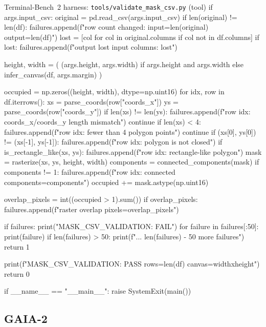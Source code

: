 \begin{promptbox}{Terminal-Bench~2 harness: \texttt{tools/validate\_mask\_csv.py} (tool)}
    if args.input_csv:
        original = pd.read_csv(args.input_csv)
        if len(original) != len(df):
            failures.append(f"row count changed: input={len(original)} output={len(df)}")
        lost = [col for col in original.columns if col not in df.columns]
        if lost:
            failures.append(f"output lost input columns: {lost}")

    height, width = (
        (args.height, args.width)
        if args.height and args.width
        else infer_canvas(df, args.margin)
    )

    occupied = np.zeros((height, width), dtype=np.uint16)
    for idx, row in df.iterrows():
        xs = parse_coords(row["coords_x"])
        ys = parse_coords(row["coords_y"])
        if len(xs) != len(ys):
            failures.append(f"row {idx}: coords_x/coords_y length mismatch")
            continue
        if len(xs) < 4:
            failures.append(f"row {idx}: fewer than 4 polygon points")
            continue
        if (xs[0], ys[0]) != (xs[-1], ys[-1]):
            failures.append(f"row {idx}: polygon is not closed")
        if is_rectangle_like(xs, ys):
            failures.append(f"row {idx}: rectangle-like polygon")
        mask = rasterize(xs, ys, height, width)
        components = connected_components(mask)
        if components != 1:
            failures.append(f"row {idx}: connected components={components}")
        occupied += mask.astype(np.uint16)

    overlap_pixels = int((occupied > 1).sum())
    if overlap_pixels:
        failures.append(f"raster overlap pixels={overlap_pixels}")

    if failures:
        print("MASK_CSV_VALIDATION: FAIL")
        for failure in failures[:50]:
            print(failure)
        if len(failures) > 50:
            print(f"... {len(failures) - 50} more failures")
        return 1

    print(f"MASK_CSV_VALIDATION: PASS rows={len(df)} canvas={width}x{height}")
    return 0


if __name__ == "__main__":
    raise SystemExit(main())
\end{promptbox}

\subsection{GAIA-2}

